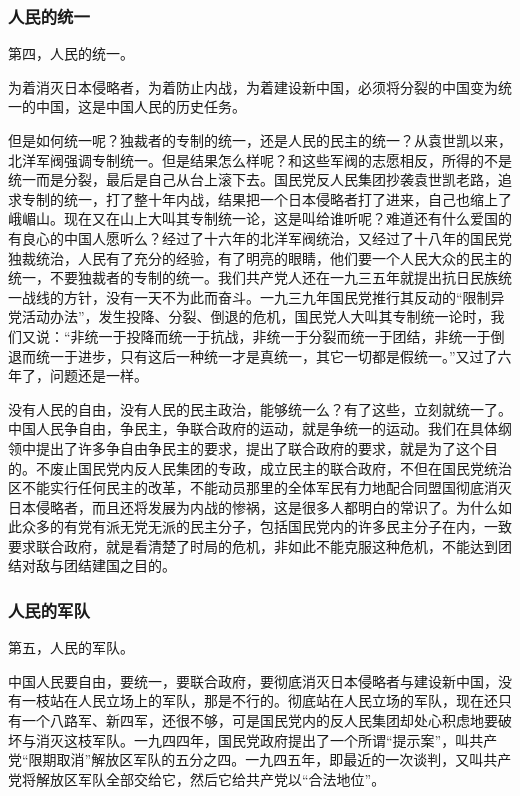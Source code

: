 \subsubsection{人民的统一}

第四，人民的统一。

为着消灭日本侵略者，为着防止内战，为着建设新中国，必须将分裂的中国变为统一的中国，这是中国人民的历史任务。

但是如何统一呢？独裁者的专制的统一，还是人民的民主的统一？从袁世凯以来，北洋军阀强调专制统一。但是结果怎么样呢？和这些军阀的志愿相反，所得的不是统一而是分裂，最后是自己从台上滚下去。国民党反人民集团抄袭袁世凯老路，追求专制的统一，打了整十年内战，结果把一个日本侵略者打了进来，自己也缩上了峨嵋山。现在又在山上大叫其专制统一论，这是叫给谁听呢？难道还有什么爱国的有良心的中国人愿听么？经过了十六年的北洋军阀统治，又经过了十八年的国民党独裁统治，人民有了充分的经验，有了明亮的眼睛，他们要一个人民大众的民主的统一，不要独裁者的专制的统一。我们共产党人还在一九三五年就提出抗日民族统一战线的方针，没有一天不为此而奋斗。一九三九年国民党推行其反动的“限制异党活动办法”，发生投降、分裂、倒退的危机，国民党人大叫其专制统一论时，我们又说：“非统一于投降而统一于抗战，非统一于分裂而统一于团结，非统一于倒退而统一于进步，只有这后一种统一才是真统一，其它一切都是假统一。”又过了六年了，问题还是一样。

没有人民的自由，没有人民的民主政治，能够统一么？有了这些，立刻就统一了。中国人民争自由，争民主，争联合政府的运动，就是争统一的运动。我们在具体纲领中提出了许多争自由争民主的要求，提出了联合政府的要求，就是为了这个目的。不废止国民党内反人民集团的专政，成立民主的联合政府，不但在国民党统治区不能实行任何民主的改革，不能动员那里的全体军民有力地配合同盟国彻底消灭日本侵略者，而且还将发展为内战的惨祸，这是很多人都明白的常识了。为什么如此众多的有党有派无党无派的民主分子，包括国民党内的许多民主分子在内，一致要求联合政府，就是看清楚了时局的危机，非如此不能克服这种危机，不能达到团结对敌与团结建国之目的。

\subsubsection{人民的军队}

第五，人民的军队。

中国人民要自由，要统一，要联合政府，要彻底消灭日本侵略者与建设新中国，没有一枝站在人民立场上的军队，那是不行的。彻底站在人民立场的军队，现在还只有一个八路军、新四军，还很不够，可是国民党内的反人民集团却处心积虑地要破坏与消灭这枝军队。一九四四年，国民党政府提出了一个所谓“提示案”，叫共产党“限期取消”解放区军队的五分之四。一九四五年，即最近的一次谈判，又叫共产党将解放区军队全部交给它，然后它给共产党以“合法地位”。

